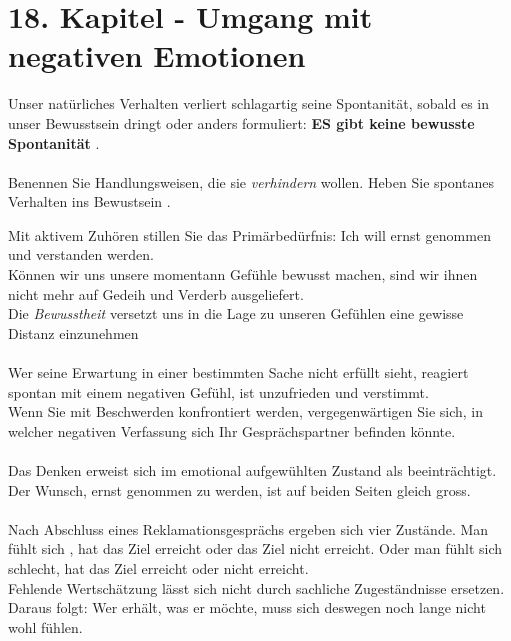 \section{18. Kapitel  - Umgang mit negativen Emotionen}
Unser natürliches Verhalten verliert schlagartig seine Spontanität, sobald es in unser Bewusstsein dringt oder anders formuliert: \textbf{ES gibt keine bewusste Spontanität} .\\
\\
Benennen Sie Handlungsweisen, die sie \emph{verhindern} wollen. Heben Sie spontanes Verhalten ins Bewustsein .\\

Mit aktivem Zuhören stillen Sie das Primärbedürfnis: \glqq Ich will ernst genommen und verstanden werden.\grqq\\
Können wir uns unsere momentann Gefühle bewusst machen, sind wir ihnen nicht mehr auf Gedeih und Verderb ausgeliefert.\\
Die \emph{Bewusstheit} versetzt uns in die Lage zu unseren Gefühlen eine gewisse Distanz einzunehmen\\
\\
Wer seine Erwartung in einer bestimmten Sache nicht erfüllt sieht, reagiert spontan mit einem negativen Gefühl, ist unzufrieden und verstimmt.
\\
Wenn Sie mit Beschwerden konfrontiert werden, vergegenwärtigen Sie sich, in welcher negativen Verfassung sich Ihr Gesprächspartner befinden könnte.\\
\\
Das Denken erweist sich im emotional aufgewühlten Zustand als beeinträchtigt. \\
Der Wunsch, ernst genommen zu werden, ist auf beiden Seiten gleich gross.\\
\\
Nach Abschluss eines Reklamationsgesprächs ergeben sich vier Zustände. Man fühlt sich , hat das Ziel erreicht oder das Ziel nicht erreicht. Oder man fühlt sich schlecht, hat das Ziel erreicht oder nicht erreicht. \\
Fehlende Wertschätzung lässt sich nicht durch sachliche Zugeständnisse ersetzen. Daraus folgt: Wer erhält, was er möchte, muss sich deswegen noch lange nicht wohl fühlen.\\
